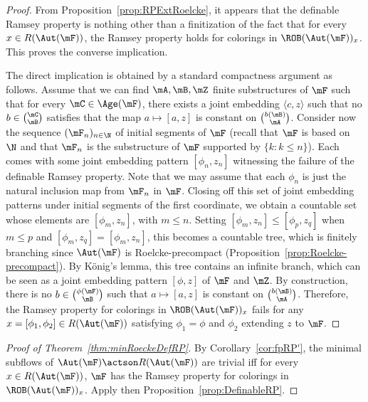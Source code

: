 \begin{proof}
From Proposition~\ref{prop:RPExtRoelcke}, it appears that the definable Ramsey property is nothing other than a finitization of the fact that for every $x\in R(\Aut(\mF))$, the Ramsey property holds for colorings in $\ROB(\Aut(\mF))_{x}$. This proves the converse implication.

The direct implication is obtained by a standard compactness argument as follows. Assume that we can find $\mA, \mB, \mZ$ finite substructures of $\mF$ such that for every $\mC\in \Age(\mF)$, there exists a joint embedding $\langle c,z \rangle$ such that no $b\in \binom{\mC}{\mB}$ satisfies that the map $a\mapsto [a,z]$ is constant on $\binom{b(\mB)}{\mA}$. Consider now the sequence $(\mF_{n})_{n\in \N}$ of initial segments of $\mF$ (recall that $\mF$ is based on $\N$ and that $\mF_{n}$ is the substructure of $\mF$ supported by $\{ k : k\leq n\}$). Each comes with some joint embedding pattern $[\phi_{n}, z_{n}]$ witnessing the failure of the definable Ramsey property. Note that we may assume that each $\phi_{n}$ is just the natural inclusion map from $\mF_{n}$ in $\mF$. Closing off this set of joint embedding patterns under initial segments of the first coordinate, we obtain a countable set whose elements are $[\phi_{m}, z_{n}]$, with $m\leq n$. Setting $[\phi_{m}, z_{n}] \leq [\phi_{p}, z_{q}]$ when $m\leq p$ and $[\phi_{m},z_{q}]=[\phi_{m},z_{n}]$, this becomes a countable tree, which is finitely branching since $\Aut(\mF)$ is Roelcke-precompact (Proposition~\ref{prop:Roelcke-precompact}). By K\"onig's lemma, this tree contains an infinite branch, which can be seen as a joint embedding pattern $[\phi, z]$ of $\mF$ and $\mZ$. By construction, there is no $b\in \binom{\phi(\mF)}{\mB}$ such that $a\mapsto [a,z]$ is constant on $\binom{b(\mB)}{\mA}$. Therefore, the Ramsey property for colorings in $\ROB(\Aut(\mF))_{x}$ fails for any $x=[\phi_{1}, \phi_{2}]\in R(\Aut(\mF))$ satisfying $\phi_{1}=\phi$ and $\phi_{2}$ extending $z$ to $\mF$.
\end{proof}



\begin{proof}[Proof of Theorem~\ref{thm:minRoeckeDefRP}]
By Corollary~\ref{cor:fpRP'}, the minimal subflows of $\Aut(\mF)\actson R(\Aut(\mF))$ are trivial iff for every $x\in R(\Aut(\mF))$, $\mF$ has the Ramsey property for colorings in $\ROB(\Aut(\mF))_{x}$. Apply then Proposition~\ref{prop:DefinableRP}.
\end{proof}



